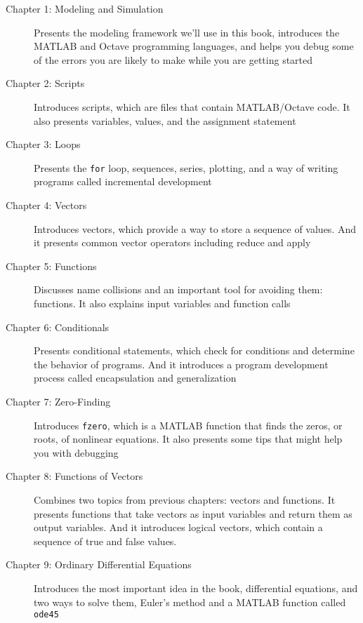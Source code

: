 \begin{description}

\item [Chapter 1: Modeling and Simulation] Presents the modeling framework we'll use in this book, introduces the MATLAB and Octave programming languages, and helps you debug some of the errors you are likely to make while you are getting started

\item [Chapter 2: Scripts] Introduces scripts, which are files that contain MATLAB/Octave code.  It also presents variables, values, and the assignment statement

\item [Chapter 3: Loops] Presents the \lstinline{for} loop, sequences, series, plotting, and a way of writing programs called incremental development

\item [Chapter 4: Vectors] Introduces vectors, which provide a way to store a sequence of values.  And it presents common vector operators including reduce and apply

\item [Chapter 5: Functions] Discusses name collisions and an important tool for avoiding them: functions.  It also explains input variables and function calls

\item [Chapter 6: Conditionals] Presents conditional statements, which check for conditions and determine the behavior of programs.  And it introduces a program development process called encapsulation and generalization

\item [Chapter 7: Zero-Finding] Introduces \lstinline{fzero}, which is a MATLAB function that finds the zeros, or roots, of nonlinear equations.  It also presents some tips that might help you with debugging

\item [Chapter 8: Functions of Vectors] Combines two topics from previous chapters: vectors and functions.  It presents functions that take vectors as input variables and return them as output variables.  And it introduces logical vectors, which contain a sequence of true and false values.

\item [Chapter 9: Ordinary Differential Equations] Introduces the most important idea in the book, differential equations, and two ways to solve them, Euler's method and a MATLAB function called \lstinline{ode45}


\end{description}

